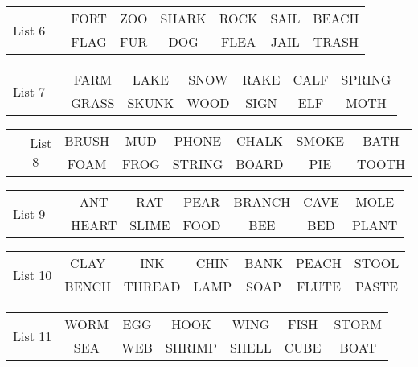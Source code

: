 \documentclass{article}
\begin{document}
\vspace{.1in}
\hspace{.5in}\begin{tabular}{r||c c c c c c }
\multirow{2}{*}{List 6~~} & FORT & ZOO & SHARK & ROCK & SAIL & BEACH\\
\cline{2-7}			& FLAG & FUR & DOG & FLEA & JAIL & TRASH\\
\end{tabular}

\vspace{.1in}
\hspace{.5in}\begin{tabular}{r||c c c c c c }
\multirow{2}{*}{List 7~~} & FARM & LAKE & SNOW & RAKE & CALF & SPRING\\
\cline{2-7}			& GRASS & SKUNK & WOOD & SIGN & ELF & MOTH\\
\end{tabular}

\vspace{.1in}
\hspace{.5in}\begin{tabular}{r||c c c c c c }
\multirow{2}{*}{List 8~~} & BRUSH & MUD & PHONE & CHALK & SMOKE & BATH\\
\cline{2-7}			& FOAM & FROG & STRING & BOARD & PIE & TOOTH\\
\end{tabular}

\vspace{.1in}
\hspace{.5in}\begin{tabular}{r||c c c c c c }
\multirow{2}{*}{List 9~~} & ANT & RAT & PEAR & BRANCH & CAVE & MOLE\\
\cline{2-7}			& HEART & SLIME & FOOD & BEE & BED & PLANT\\
\end{tabular}

\vspace{.1in}
\hspace{.5in}\begin{tabular}{r||c c c c c c }
\multirow{2}{*}{List 10} & CLAY & INK & CHIN & BANK & PEACH & STOOL\\
\cline{2-7}			& BENCH & THREAD & LAMP & SOAP & FLUTE & PASTE\\
\end{tabular}

\vspace{.1in}
\hspace{.5in}\begin{tabular}{r||c c c c c c }
\multirow{2}{*}{List 11} & WORM & EGG & HOOK & WING & FISH & STORM\\
\cline{2-7}			& SEA & WEB & SHRIMP & SHELL & CUBE & BOAT\\
\end{tabular}
\end{document}
